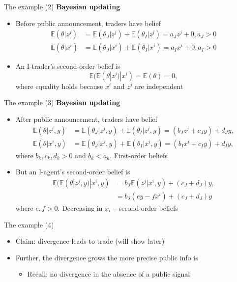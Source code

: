 \documentclass[english,10pt
,aspectratio=169
]{beamer}
\begin{document}
\begin{frame}{The example (2)}
	\textbf{Bayesian updating}
	\begin{itemize}
		\item Before public announcement, traders have belief
		\begin{align*}
			\mathbb{E}(\theta|z^{j}) & =\mathbb{E}(\theta_{J}|z^{j})+\mathbb{E}(\theta_{I}|z^{j})=a_J z^{j}+0, a_J>0 \\
			\mathbb{E}(\theta|x^{i}) &=\mathbb{E}(\theta_{J}|x^{i})+\mathbb{E}(\theta_{I}|x^{i})=a_I x^{i}+0, a_I>0
		\end{align*}
		\item An I-trader's second-order belief is
		\[
		\mathbb{E}(\mathbb{E}(\theta|z^{j})|x^{i})=\mathbb{E}(\theta) = 0,
		\]
		where equality holds because $x^{i}$ and $z^{j}$ are independent
	\end{itemize}
\end{frame}


\begin{frame}{The example (3)}
	\textbf{Bayesian updating}
	\begin{itemize}
		\item After public announcement, traders have belief
		\begin{align*}
			\mathbb{E}(\theta|z^{j}, y) & =\mathbb{E}(\theta_{J}|z^{j},y)+\mathbb{E}(\theta_{I}|z^{j},y)=(b_J z^{j}+c_Jy)+d_J y,  \\
			\mathbb{E}(\theta|x^{i}, y) & =\mathbb{E}(\theta_{J}|x^{i},y)+\mathbb{E}(\theta_{I}|x^{i},y)=(b_I x^{i}+c_I y)+d_I y,
		\end{align*}
		where $b_k,c_k,d_k>0$ and $b_k<a_k$. First-order beliefs 
		\item But an I-agent's second-order belief  is
		\begin{align*}
			\mathbb{E}(\mathbb{E}(\theta|z^{j},y)|x^{i},y)
			&=b_J\mathbb{E}(z^{j}|x^{i},y)+(c_J+d_J)y, \\
			&=b_J(ey-fx^{i})+(c_J+d_J)y 
		\end{align*}
		where $e,f>0$. 
		Decreasing in $x_i$ -- second-order beliefs 
	\end{itemize}
\end{frame}


\begin{frame}{The example (4)}
	\begin{itemize}
		\item Claim: divergence leads to trade (will show later)
		\item Further, the divergence grows the more precise public info is
		\begin{itemize}
			\item Recall: no divergence in the absence of a public signal
		\end{itemize}
	\end{itemize}
\end{frame}
\end{document}
